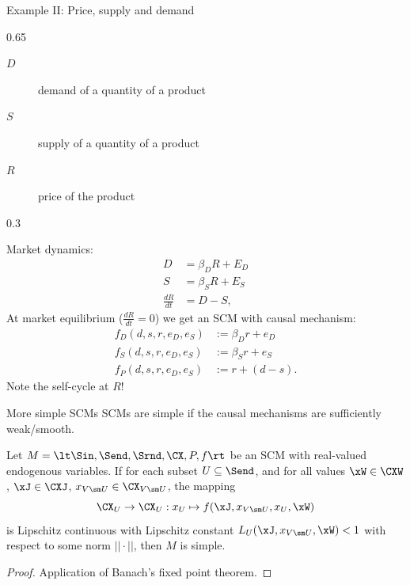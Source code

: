 \begin{frame}{Example II: Price, supply and demand}
  \begin{topalignedcolumn}{0.65\linewidth}
  \begin{description}
     \item[$D$] demand of a quantity of a product
     \item[$S$] supply of a quantity of a product
     \item[$R$] price of the product
  \end{description}
  \end{topalignedcolumn}\hfill%
  \begin{topalignedcolumn}{0.3\linewidth}
  \end{topalignedcolumn}

  \medskip
  Market dynamics:
$$\begin{aligned}
    D &= \beta_D R + E_D \\
    S &= \beta_S R + E_S \\
    \frac{dR}{dt} &= D - S,
  \end{aligned}$$
  At market equilibrium ($\frac{dR}{dt}=0$) we get an SCM with causal mechanism:
$$
  \begin{aligned}
    f_D(d,s,r,e_D,e_S) &:= \beta_D r + e_D \\
    f_S(d,s,r,e_D,e_S) &:= \beta_S r + e_S \\
    f_P(d,s,r,e_D,e_S) &:= r + (d - s).
  \end{aligned}
$$
  Note the self-cycle at $R$!
\end{frame}

\begin{frame}{More simple SCMs}
  SCMs are simple if the causal mechanisms are sufficiently weak/smooth.
  \begin{Prp}[\ref{prp:simple_scm_contraction}]
  Let $M = \lt \Sin, \Send, \Srnd, \CX, P, f \rt$ be an SCM with real-valued endogenous variables.
  If for each subset $U \subseteq \Send$, and for all values $\xW\in\CXW$, $\xJ \in \CXJ$, $x_{V\sm U} \in \CX_{V\sm U}$, the mapping
  \begin{equation*}
  \CX_U \to \CX_U : x_U \mapsto f(\xJ,x_{V\sm U},x_U,\xW)
  \end{equation*}
  is Lipschitz continuous with Lipschitz constant $L_U(\xJ,x_{V\sm U},\xW) < 1$ with respect to some norm $||\cdot||$, then $M$ is simple.
\end{Prp}
\begin{proof}
  Application of Banach's fixed point theorem.
\end{proof}
\end{frame}

